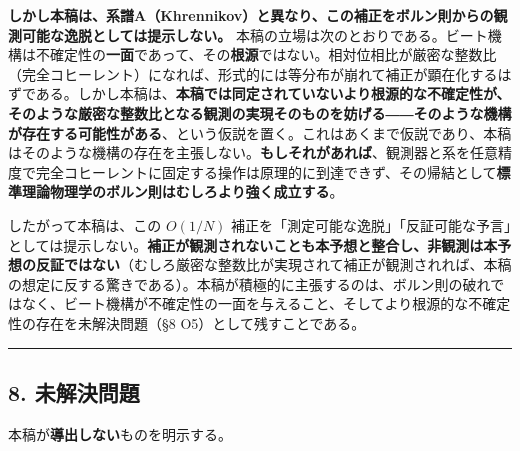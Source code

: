 \documentclass[
]{ltjsarticle}
\begin{document}
\textbf{しかし本稿は、系譜A（Khrennikov）と異なり、この補正をボルン則からの観測可能な逸脱としては提示しない。}
本稿の立場は次のとおりである。ビート機構は不確定性の\textbf{一面}であって、その\textbf{根源}ではない。相対位相比が厳密な整数比（完全コヒーレント）になれば、形式的には等分布が崩れて補正が顕在化するはずである。しかし本稿は、\textbf{本稿では同定されていないより根源的な不確定性が、そのような厳密な整数比となる観測の実現そのものを妨げる――そのような機構が存在する可能性がある}、という仮説を置く。これはあくまで仮説であり、本稿はそのような機構の存在を主張しない。\textbf{もしそれがあれば}、観測器と系を任意精度で完全コヒーレントに固定する操作は原理的に到達できず、その帰結として\textbf{標準理論物理学のボルン則はむしろより強く成立する}。

したがって本稿は、この \(O(1/N)\)
補正を「測定可能な逸脱」「反証可能な予言」としては提示しない。\textbf{補正が観測されないことも本予想と整合し、非観測は本予想の反証ではない}（むしろ厳密な整数比が実現されて補正が観測されれば、本稿の想定に反する驚きである）。本稿が積極的に主張するのは、ボルン則の破れではなく、ビート機構が不確定性の一面を与えること、そしてより根源的な不確定性の存在を未解決問題（§8
O5）として残すことである。

\begin{center}\rule{0.5\linewidth}{0.5pt}\end{center}

\subsection{8. 未解決問題}\label{ux672aux89e3ux6c7aux554fux984c}

本稿が\textbf{導出しない}ものを明示する。
\end{document}
